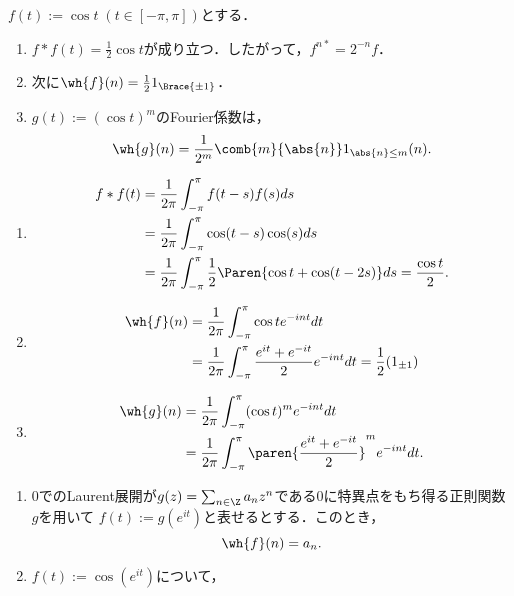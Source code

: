 \documentclass[uplatex,dvipdfmx]{jsreport}
\begin{document}
\begin{example}[三角関数の冪]
    $f(t):=\cos t\;(t\in[-\pi,\pi])$とする．
    \begin{enumerate}
        \item $f*f(t)=\frac{1}{2}\cos t$が成り立つ．したがって，$f^{n*}=2^{-n}f$．
        \item 次に$\wh{f}(n)=\frac{1}{2}1_{\Brace{\pm1}}$．
        \item $g(t):=(\cos t)^m$のFourier係数は，
        \[\wh{g}(n)=\frac{1}{2^m}\comb{m}{\abs{n}}1_{\abs{n}\le m}(n).\]
    \end{enumerate}
\end{example}
\begin{Proof}\mbox{}
    \begin{enumerate}
        \item \begin{align*}
            f*f(t)&=\frac{1}{2\pi}\int^\pi_{-\pi}f(t-s)f(s)ds\\
            &=\frac{1}{2\pi}\int^\pi_{-\pi}\cos(t-s)\cos(s)ds\\
            &=\frac{1}{2\pi}\int^\pi_{-\pi}\frac{1}{2}\Paren{\cos t+\cos(t-2s)}ds
            =\frac{\cos t}{2}.
        \end{align*}
        \item \begin{align*}
            \wh{f}(n)&=\frac{1}{2\pi}\int^\pi_{-\pi}\cos te^{-int}dt\\
            &=\frac{1}{2\pi}\int^\pi_{-\pi}\frac{e^{it}+e^{-it}}{2}e^{-int}dt=\frac{1}{2}(1_{\pm1})
        \end{align*}
        \item \begin{align*}
            \wh{g}(n)&=\frac{1}{2\pi}\int^\pi_{-\pi}(\cos t)^me^{-int}dt\\
            &=\frac{1}{2\pi}\int^\pi_{-\pi}\paren{\frac{e^{it}+e^{-it}}{2}}^me^{-int}dt.
        \end{align*}
    \end{enumerate}
\end{Proof}

\begin{example}[単位円周上の複素積分との繋がり]\mbox{}
    \begin{enumerate}
        \item $0$でのLaurent展開が$g(z)=\sum_{n\in\Z}a_nz^n$である$0$に特異点をもち得る正則関数$g$を用いて
        $f(t):=g(e^{it})$と表せるとする．このとき，
        \[\wh{f}(n)=a_n.\]
        \item $f(t):=\cos(e^{it})$について，
    \end{enumerate}
\end{example}
\end{document}
